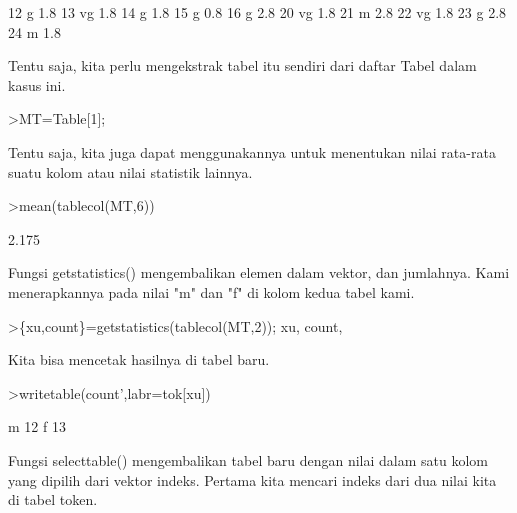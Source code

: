 \documentclass{article}
\begin{document}
\begin{eulernotebook}
\begin{eulercomment}
\begin{eulercomment}
\begin{euleroutput}
          12          g       1.8
          13         vg       1.8
          14          g       1.8
          15          g       0.8
          16          g       2.8
          20         vg       1.8
          21          m       2.8
          22         vg       1.8
          23          g       2.8
          24          m       1.8
\end{euleroutput}
\begin{eulercomment}
Tentu saja, kita perlu mengekstrak tabel itu sendiri dari daftar Tabel
dalam kasus ini.
\end{eulercomment}
\begin{eulerprompt}
>MT=Table[1];
\end{eulerprompt}
\begin{eulercomment}
Tentu saja, kita juga dapat menggunakannya untuk menentukan nilai
rata-rata suatu kolom atau nilai statistik lainnya.
\end{eulercomment}
\begin{eulerprompt}
>mean(tablecol(MT,6))
\end{eulerprompt}
\begin{euleroutput}
  2.175
\end{euleroutput}
\begin{eulercomment}
Fungsi getstatistics() mengembalikan elemen dalam vektor, dan
jumlahnya. Kami menerapkannya pada nilai "m" dan "f" di kolom kedua
tabel kami.
\end{eulercomment}
\begin{eulerprompt}
>\{xu,count\}=getstatistics(tablecol(MT,2)); xu, count,
\end{eulerprompt}
\begin{euleroutput}
  [1,  3]
  [12,  13]
\end{euleroutput}
\begin{eulercomment}
Kita bisa mencetak hasilnya di tabel baru.
\end{eulercomment}
\begin{eulerprompt}
>writetable(count',labr=tok[xu])
\end{eulerprompt}
\begin{euleroutput}
           m        12
           f        13
\end{euleroutput}
\begin{eulercomment}
Fungsi selecttable() mengembalikan tabel baru dengan nilai dalam satu
kolom yang dipilih dari vektor indeks. Pertama kita mencari indeks
dari dua nilai kita di tabel token.
\end{eulercomment}
\begin{eulerprompt}

\end{eulerprompt}
\end{eulercomment}
\end{eulercomment}
\end{eulernotebook}
\end{document}
